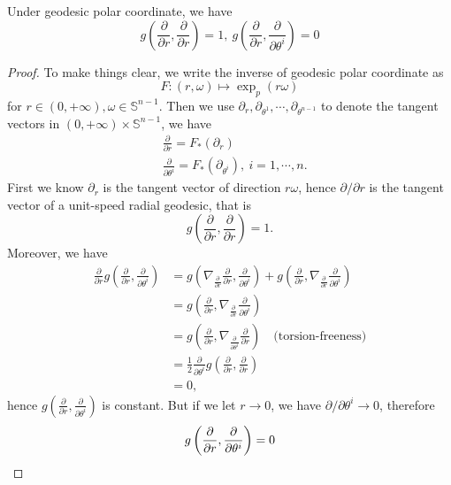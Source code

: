 \begin{prop}
    Under geodesic polar coordinate, we have
    \[g\left(\frac{\partial{}}{\partial{r}},\frac{\partial{}}{\partial{r}}\right)=1,\ g\left(\frac{\partial{}}{\partial{r}},\frac{\partial{}}{\partial{\theta^i}}\right)=0\]
\end{prop}
\begin{proof}
    To make things clear, we write the inverse of geodesic polar coordinate as
    \[F:(r,\omega)\mapsto\exp_p(r\omega)\]
    for $r\in(0,+\infty),\omega\in\mathbb{S}^{n-1}$.
    Then we use $\partial_r,\partial_{\theta^1},\cdots,\partial_{\theta^{n-1}}$ to denote the tangent vectors in $(0,+\infty)\times\mathbb{S}^{n-1}$, we have
    \begin{align*}
        &\frac{\partial{}}{\partial{r}}=F_*(\partial_r)\\
        &\frac{\partial{}}{\partial{\theta^i}}=F_*(\partial_{\theta^i}),\ i=1,\cdots,n.
    \end{align*}
    First we know $\partial_r$ is the tangent vector of direction $r\omega$, hence $\partial{}/\partial{r}$ is the tangent vector of a unit-speed radial geodesic, that is
    \[g\left(\frac{\partial{}}{\partial{r}},\frac{\partial{}}{\partial{r}}\right)=1.\]
    Moreover, we have
    \begin{align*}
        \frac{\partial{}}{\partial{r}}g\left(\frac{\partial{}}{\partial{r}},\frac{\partial{}}{\partial{\theta^i}}\right)&=g\left(\nabla_{\frac{\partial{}}{\partial{r}}}\frac{\partial{}}{\partial{r}},\frac{\partial{}}{\partial{\theta^i}}\right)+g\left(\frac{\partial{}}{\partial{r}},\nabla_{\frac{\partial{}}{\partial{r}}}\frac{\partial{}}{\partial{\theta^i}}\right)\\
        &=g\left(\frac{\partial{}}{\partial{r}},\nabla_{\frac{\partial{}}{\partial{r}}}\frac{\partial{}}{\partial{\theta^i}}\right)\\
        &=g\left(\frac{\partial{}}{\partial{r}},\nabla_{\frac{\partial{}}{\partial{\theta^i}}}\frac{\partial{}}{\partial{r}}\right)\quad\text{(torsion-freeness)}\\
        &=\frac{1}{2}\frac{\partial{}}{\partial{\theta^i}}g\left(\frac{\partial{}}{\partial{r}},\frac{\partial{}}{\partial{r}}\right)\\
        &=0,
    \end{align*}
    hence $g\left(\frac{\partial{}}{\partial{r}},\frac{\partial{}}{\partial{\theta^i}}\right)$ is constant.
    But if we let $r\to 0$, we have $\partial{}/\partial{\theta^i}\to 0$, therefore
    \[g\left(\frac{\partial{}}{\partial{r}},\frac{\partial{}}{\partial{\theta^i}}\right)=0\qedhere\]
\end{proof}

